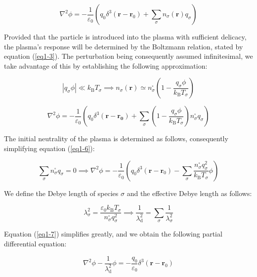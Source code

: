\begin{equation}
    \nabla^2\phi=-\frac{1}{\varepsilon_0}\left(q_0\delta^3(\mathbf{r}-\mathbf{r}_0)+\sum_{\sigma}n_\sigma(\mathbf{r})q_\sigma\right)
\end{equation}

Provided that the particle is introduced into the plasma with sufficient delicacy, the plasma's response will be determined by the Boltzmann relation, stated by equation (\ref{eq1-3}). The perturbation being consequently assumed infinitesimal, we take advantage of this by establishing the following approximation:

\begin{equation}
    |q_\sigma\phi|\ll k_\mathrm{B}T_\sigma\implies n_\sigma(\mathbf{r})\simeq n_\sigma^\square\left(1-\frac{q_\sigma\phi}{k_\mathrm{B}T_\sigma}\right)
\end{equation}

\begin{equation}
    \label{eq1-6}
    \nabla^2\phi=-\frac{1}{\varepsilon_0}\left(q_0\delta^3(\mathbf{r-\mathbf{r}_0})+\sum_{\sigma}\left(1-\frac{q_\sigma\phi}{k_\mathrm{B}T_\sigma}\right)n_\sigma^\square q_\sigma\right)
\end{equation}

The initial neutrality of the plasma is determined as follows, consequently simplifying equation (\ref{eq1-6}):

\begin{equation}
    \label{eq1-7}
    \sum_\sigma n_\sigma^\square q_\sigma=0\implies\nabla^2\phi=-\frac{1}{\varepsilon_0}\left(q_0\delta^3(\mathbf{r}-\mathbf{r}_0)-\sum_\sigma\frac{n_\sigma^\square q_\sigma^2}{k_\mathrm{B}T_\sigma}\phi\right)
\end{equation}

We define the Debye length of species $\sigma$ and the effective Debye length as follows:

\begin{equation}
    \lambda_\sigma^2=\frac{\varepsilon_0k_\mathrm{B}T_\sigma}{n_\sigma^\square q_\sigma^2}\implies\frac{1}{\lambda_\mathrm{d}^2}=\sum_\sigma\frac{1}{\lambda^2_\sigma}
\end{equation}

Equation (\ref{eq1-7}) simplifies greatly, and we obtain the following partial differential equation:

\begin{equation}
    \label{eq1-9}
    \nabla^2\phi-\frac{1}{\lambda_\mathrm{d}^2}\phi=-\frac{q_0}{\varepsilon_0}\delta^3(\mathbf{r}-\mathbf{r}_0)
\end{equation}

